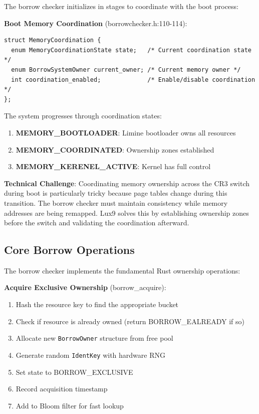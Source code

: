 \documentclass[11pt,letterpaper]{article}
\begin{document}
The borrow checker initializes in stages to coordinate with the boot process:

\textbf{Boot Memory Coordination} (borrowchecker.h:110-114):

\begin{lstlisting}
struct MemoryCoordination {
  enum MemoryCoordinationState state;   /* Current coordination state */
  enum BorrowSystemOwner current_owner; /* Current memory owner */
  int coordination_enabled;             /* Enable/disable coordination */
};
\end{lstlisting}

The system progresses through coordination states:
\begin{enumerate}
\item \textbf{MEMORY\_BOOTLOADER}: Limine bootloader owns all resources
\item \textbf{MEMORY\_COORDINATED}: Ownership zones established
\item \textbf{MEMORY\_KERENEL\_ACTIVE}: Kernel has full control
\end{enumerate}

\textbf{Technical Challenge}: Coordinating memory ownership across the CR3 switch during boot is particularly tricky because page tables change during this transition. The borrow checker must maintain consistency while memory addresses are being remapped. Lux9 solves this by establishing ownership zones before the switch and validating the coordination afterward.

\subsection{Core Borrow Operations}

The borrow checker implements the fundamental Rust ownership operations:

\textbf{Acquire Exclusive Ownership} (borrow\_acquire):

\begin{enumerate}
\item Hash the resource key to find the appropriate bucket
\item Check if resource is already owned (return BORROW\_EALREADY if so)
\item Allocate new \texttt{BorrowOwner} structure from free pool
\item Generate random \texttt{IdentKey} with hardware RNG
\item Set state to BORROW\_EXCLUSIVE
\item Record acquisition timestamp
\item Add to Bloom filter for fast lookup
\end{enumerate}
\end{document}
